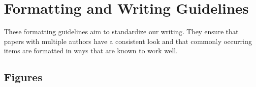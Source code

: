 \documentclass[a4paper]{article}
\newenvironment{draftonly}{}{}
\begin{document}
\begin{draftonly}
\cleardoublepage

\appendix
\section{Formatting and Writing Guidelines}

These formatting guidelines aim to standardize our writing. They ensure that
papers with multiple authors have a consistent look and that commonly occurring
items are formatted in ways that are known to work well.

\subsection{Figures}
\label{appendix:figures}


\end{draftonly}
\end{document}
